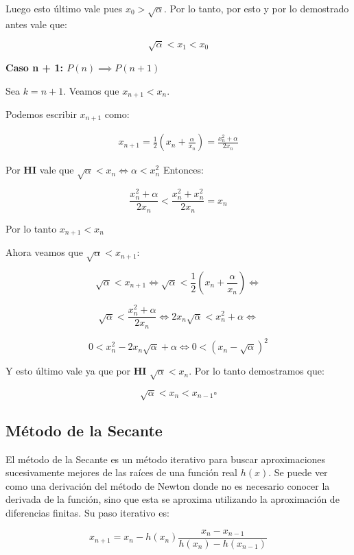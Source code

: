 Luego esto último vale pues $x_0 > \sqrt{\alpha}$. Por lo tanto, por esto y por lo demostrado antes vale que:

\[
    \sqrt{\alpha} < x_1 < x_0
\]

{\bf Caso n + 1: $P(n) \implies P(n + 1)$}

Sea $k = n + 1$. Veamos que $x_{n + 1} < x_n$.

Podemos escribir $x_{n + 1}$ como:

\begin{align*}
    x_{n + 1} = \frac{ 1 }{ 2 }(x_n + \frac{ \alpha }{ x_n }) = \frac{ x_n^2 + \alpha }{ 2x_n }
\end{align*}

Por {\bf HI} vale que $\sqrt{\alpha} < x_n \iff \alpha < x_n^2 $ Entonces:

\[
    \frac{ x_n^2 + \alpha } {2x_n } < \frac{ x_n^2 + x_n^2 }{ 2x_n } = x_n
\]

Por lo tanto $x_{n + 1} < x_n$

Ahora veamos que $\sqrt{\alpha} < x_{n + 1}$:

\[
    \sqrt{\alpha} < x_{n + 1} \iff \sqrt{\alpha} < \frac{1}{2}(x_n + \frac{\alpha}{x_n}) \iff
\]

\[
     \sqrt{\alpha} < \frac{x_n^2 + \alpha}{2x_n} \iff 2x_n\sqrt{\alpha} < x_n^2 + \alpha \iff
\]

\[
     0 < x_n^2 - 2x_n\sqrt{\alpha} + \alpha \iff 0 < {(x_n - \sqrt{\alpha})}^2
\]

Y esto último vale ya que por {\bf HI} $\sqrt{\alpha} < x_n$. Por lo tanto demostramos que:

\[
    \sqrt{\alpha} < x_n < x_{n - 1} \square
\]

\subsection{Método de la Secante}

El método de la Secante es un método iterativo para buscar aproximaciones
sucesivamente mejores de las raíces de una función real $h(x)$. Se puede ver
como una derivación del método de Newton donde no es necesario conocer la
derivada de la función, sino que esta se aproxima utilizando la aproximación de
diferencias finitas. Su paso iterativo es:

\begin{equation}\label{secante}
    x_{n + 1} = x_n - h(x_n) \frac{ x_n - x_{n - 1} }{ h(x_n) - h(x_{n - 1}) }
\end{equation}

